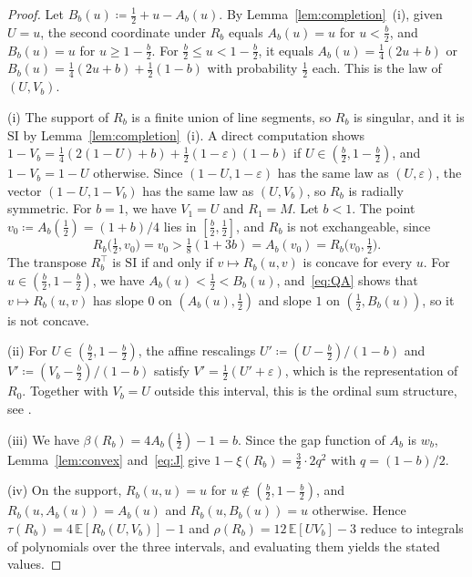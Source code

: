 \documentclass[twocolumn,a4paper]{article}
\numberwithin{equation}{section}
\theoremstyle{remark}
\newcommand{\1}{\mathbf{1}}
\newcommand{\SI}{\mathrm{SI}}
\begin{document}
\begin{proof}
Let \(B_b(u)\coloneqq\tfrac12+u-A_b(u)\).
By Lemma~\ref{lem:completion}~(i), given \(U=u\), the second coordinate under \(R_b\) equals \(A_b(u)=u\) for \(u<\tfrac b2\), and \(B_b(u)=u\) for \(u\ge1-\tfrac b2\).
For \(\tfrac b2\le u<1-\tfrac b2\), it equals \(A_b(u)=\tfrac14(2u+b)\) or \(B_b(u)=\tfrac14(2u+b)+\tfrac12(1-b)\) with probability \(\tfrac12\) each.
This is the law of \((U,V_b)\).

(i) The support of \(R_b\) is a finite union of line segments, so \(R_b\) is singular, and it is \(\SI\) by Lemma~\ref{lem:completion}~(i).
A direct computation shows \(1-V_b=\tfrac14(2(1-U)+b)+\tfrac12(1-\varepsilon)(1-b)\) if \(U\in(\tfrac b2,1-\tfrac b2)\), and \(1-V_b=1-U\) otherwise.
Since \((1-U,1-\varepsilon)\) has the same law as \((U,\varepsilon)\), the vector \((1-U,1-V_b)\) has the same law as \((U,V_b)\), so \(R_b\) is radially symmetric.
For \(b=1\), we have \(V_1=U\) and \(R_1=M\).
Let \(b<1\).
The point \(v_0\coloneqq A_b(\tfrac12)=(1+b)/4\) lies in \([\tfrac b2,\tfrac12]\), and \(R_b\) is not exchangeable, since
\[
R_b\bigl(\tfrac12,v_0\bigr)=v_0>\tfrac18(1+3b)=A_b(v_0)=R_b\bigl(v_0,\tfrac12\bigr).
\]
The transpose \(R_b^\top\) is \(\SI\) if and only if \(v\mapsto R_b(u,v)\) is concave for every \(u\).
For \(u\in(\tfrac b2,1-\tfrac b2)\), we have \(A_b(u)<\tfrac12<B_b(u)\), and~\eqref{eq:QA} shows that \(v\mapsto R_b(u,v)\) has slope \(0\) on \((A_b(u),\tfrac12)\) and slope \(1\) on \((\tfrac12,B_b(u))\), so it is not concave.

(ii) For \(U\in(\tfrac b2,1-\tfrac b2)\), the affine rescalings \(U'\coloneqq(U-\tfrac b2)/(1-b)\) and \(V'\coloneqq(V_b-\tfrac b2)/(1-b)\) satisfy \(V'=\tfrac12(U'+\varepsilon)\), which is the representation of \(R_0\).
Together with \(V_b=U\) outside this interval, this is the ordinal sum structure, see \cite[Sec.~3.2]{nelsen2006introduction}.

(iii) We have \(\beta(R_b)=4A_b(\tfrac12)-1=b\).
Since the gap function of \(A_b\) is \(w_b\), Lemma~\ref{lem:convex} and~\eqref{eq:J} give \(1-\xi(R_b)=\tfrac32\cdot2q^2\) with \(q=(1-b)/2\).

(iv) On the support, \(R_b(u,u)=u\) for \(u\notin(\tfrac b2,1-\tfrac b2)\), and \(R_b(u,A_b(u))=A_b(u)\) and \(R_b(u,B_b(u))=u\) otherwise.
Hence \(\tau(R_b)=4\,\mathbb E[R_b(U,V_b)]-1\) and \(\rho(R_b)=12\,\mathbb E[UV_b]-3\) reduce to integrals of polynomials over the three intervals, and evaluating them yields the stated values.
\end{proof}
\end{document}
